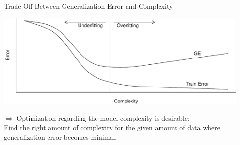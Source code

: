 \documentclass[11pt,compress,t,notes=noshow, xcolor=table]{beamer}
\newenvironment{knitrout}{}{} %
\begin{document}
\begin{vbframe}{Trade-Off Between Generalization Error and Complexity}


\lz
\begin{knitrout}\scriptsize
{}\color{fgcolor}

{\centering \includegraphics[width=0.95\textwidth]{figure/eval_ofit_3} 

}



\end{knitrout}

\lz
$\Rightarrow$ Optimization regarding the model complexity is desirable:\\ 
Find the right amount of complexity for the given amount of data where generalization error becomes minimal.

\end{vbframe}

\endlecture
\end{document}
